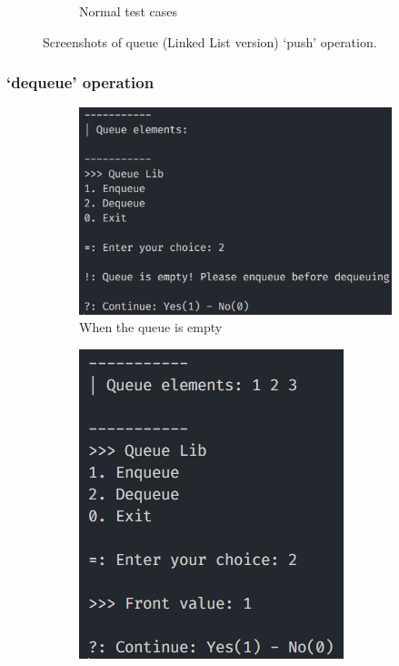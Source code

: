 \begin{figure}[!ht]
\begin{subfigure}{0.43\textwidth}
		\caption{Normal test cases}\label{fig:queue_ll_push_normal}
	\end{subfigure}
	\caption{Screenshots of queue (Linked List version) `push' operation.}\label{fig:queue_ll_push_cases}
\end{figure}
\subsubsection*{`dequeue' operation}
\begin{figure}[!ht]
	\centering
	\begin{subfigure}{0.6\textwidth}
		\centering
		\includegraphics[width=\textwidth]{imgs/queueLinkedList/pop/empty.png}
		\caption{When the queue is empty}\label{fig:queue_ll_pop_empty}
	\end{subfigure}
	\hfill
	\begin{subfigure}{0.34\textwidth}
		\centering
		\includegraphics[width=\textwidth]{imgs/queueLinkedList/pop/normal.png}

\end{subfigure}
\end{figure}
